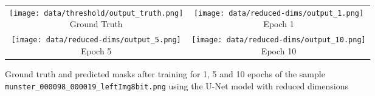 \begin{figure}
    \centering
    \begin{tabular}{cc}
        \makecell{
            \texttt{[image: data/threshold/output\_truth.png]} \\
            Ground Truth 
        } &
        \makecell{
            \texttt{[image: data/reduced-dims/output\_1.png]} \\
            Epoch 1
        } \\
        \makecell{
            \texttt{[image: data/reduced-dims/output\_5.png]} \\
            Epoch 5
        } &
        \makecell {
            \texttt{[image: data/reduced-dims/output\_10.png]} \\
            Epoch 10
        } \\ 
        
    \end{tabular}
    \caption{Ground truth and predicted masks after training for 1, 5 and 10 epochs of the sample \texttt{munster\_000098\_000019\_leftImg8bit.png} using the U-Net model with reduced dimensions}    
\end{figure}